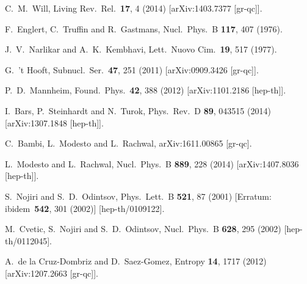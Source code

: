 \documentclass[aps, prd, amsmath, floats, floatfix, twocolumn, nofootinbib, superscriptaddress, showpacs]{revtex4-1}
\begin{document}
\begin{thebibliography}{99}

  C.~M.~Will,
  Living Rev.\ Rel.\  {\bf 17}, 4 (2014)
  [arXiv:1403.7377 [gr-qc]].

  F.~Englert, C.~Truffin and R.~Gastmans,
  Nucl.\ Phys.\ B {\bf 117}, 407 (1976).

  J.~V.~Narlikar and A.~K.~Kembhavi,
  Lett.\ Nuovo Cim.\  {\bf 19}, 517 (1977).

  G.~'t Hooft,
  Subnucl.\ Ser.\  {\bf 47}, 251 (2011)
  [arXiv:0909.3426 [gr-qc]].

  P.~D.~Mannheim,
  Found.\ Phys.\  {\bf 42}, 388 (2012)
  [arXiv:1101.2186 [hep-th]].
  
  I.~Bars, P.~Steinhardt and N.~Turok,
  Phys.\ Rev.\ D {\bf 89}, 043515 (2014)
  [arXiv:1307.1848 [hep-th]].

  C.~Bambi, L.~Modesto and L.~Rachwal,
  arXiv:1611.00865 [gr-qc].
  
  L.~Modesto and L.~Rachwal,
  Nucl.\ Phys.\ B {\bf 889}, 228 (2014)
  [arXiv:1407.8036 [hep-th]].  
  
  S.~Nojiri and S.~D.~Odintsov,
  Phys.\ Lett.\ B {\bf 521}, 87 (2001)
  [Erratum: ibidem\ {\bf 542}, 301 (2002)]
  [hep-th/0109122].  
  
  M.~Cvetic, S.~Nojiri and S.~D.~Odintsov,
  Nucl.\ Phys.\ B {\bf 628}, 295 (2002)
  [hep-th/0112045].

  A.~de la Cruz-Dombriz and D.~Saez-Gomez,
  Entropy {\bf 14}, 1717 (2012)
  [arXiv:1207.2663 [gr-qc]].  
  

\end{thebibliography}
\end{document}
